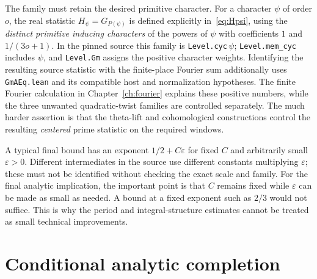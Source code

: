 \documentclass[11pt,openany,oneside]{scrbook}
\theoremstyle{definition}
\theoremstyle{remark}
\newcommand{\eps}{\varepsilon}
\begin{document}
The family must retain the desired primitive character. For a character $\psi$ of order $o$, the real statistic $H_\psi=G_{P(\psi)}$ is defined explicitly in~\eqref{eq:Hpsi}, using the \emph{distinct primitive inducing characters} of the powers of $\psi$ with coefficients $1$ and $1/(3o+1)$. In the pinned source this family is \texttt{Level.cyc}\,$\psi$; \texttt{Level.mem\_cyc} includes $\psi$, and \texttt{Level.Gm} assigns the positive character weights. Identifying the resulting source statistic with the finite-place Fourier sum additionally uses \texttt{GmAEq.lean} and its compatible host and normalization hypotheses. The finite Fourier calculation in Chapter~\ref{ch:fourier} explains these positive numbers, while the three unwanted quadratic-twist families are controlled separately. The much harder assertion is that the theta-lift and cohomological constructions control the resulting \emph{centered} prime statistic on the required windows.

A typical final bound has an exponent $1/2+C\eps$ for fixed $C$ and arbitrarily small $\eps>0$. Different intermediates in the source use different constants multiplying $\eps$; these must not be identified without checking the exact scale and family. For the final analytic implication, the important point is that $C$ remains fixed while $\eps$ can be made as small as needed. A bound at a fixed exponent such as $2/3$ would not suffice. This is why the period and integral-structure estimates cannot be treated as small technical improvements.

\section{Conditional analytic completion}
\end{document}
